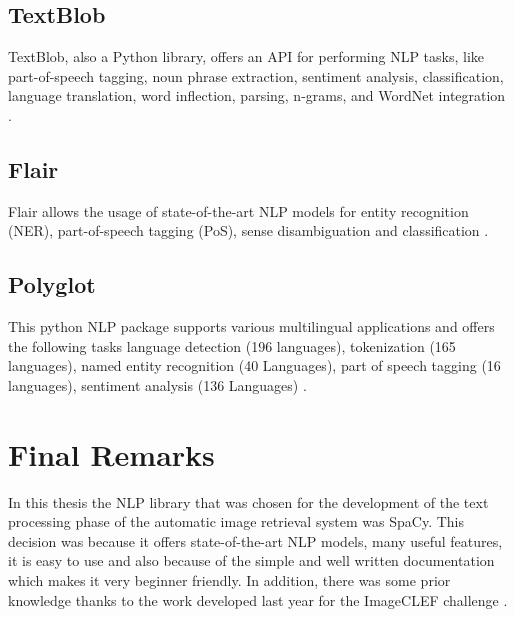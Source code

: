         \subsection{TextBlob}

        TextBlob, also a Python library,  offers an API for performing NLP tasks, like part-of-speech tagging, noun phrase extraction, sentiment analysis, classification, language translation, word inflection, parsing, n-grams, and WordNet integration \cite{textblob}.

        \subsection{Flair}

        Flair allows the usage of state-of-the-art NLP models for entity recognition (NER), part-of-speech tagging (PoS), sense disambiguation and classification \cite{akbik2018coling}.

        \subsection{Polyglot}

        This python NLP package supports various multilingual applications and offers the following tasks
        language detection (196 languages), tokenization (165 languages), named entity recognition (40 Languages), part of speech tagging (16 languages), sentiment analysis (136 Languages) \cite{polyglot:2013:ACL-CoNLL}.
    


        
        \section{Final Remarks}
        \label{sec:final_remarks}

        In this thesis the NLP library that was chosen for the development of the text processing phase of the automatic image retrieval system was SpaCy. This decision was because it offers state-of-the-art NLP models, many useful features, it is easy to use and also because of the simple and well written documentation which makes it very beginner friendly. In addition, there was some prior knowledge thanks to the work developed last year for the ImageCLEF challenge \cite{Ribeiro2019}. 
        
        
